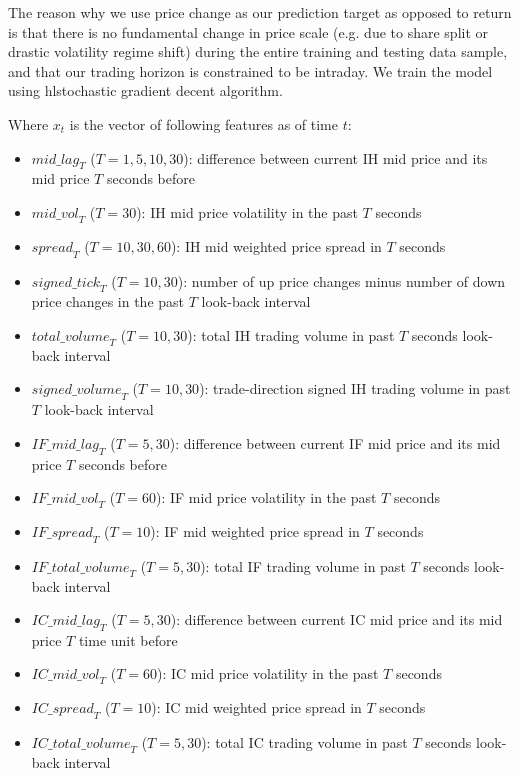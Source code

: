 \documentclass{article}
\begin{document}
The reason why we use price change as our prediction target as opposed to return is that there is no fundamental change in price scale (e.g. due to share split or drastic volatility regime shift) during the entire training and testing data sample, and that our trading horizon is constrained to be intraday. We train the model using hl{stochastic gradient decent algorithm}.

Where $x_t$ is the vector of following features as of time $t$:

\begin{itemize}
\setlength\itemsep{0.1em}
\item ${mid\_lag}_T$ ($T=1,5,10,30$): difference between current IH mid price and its mid price $T$ seconds before
\item ${mid\_vol}_T$ ($T=30$): IH mid price volatility in the past $T$ seconds
\item ${spread}_T$ ($T=10,30,60$): IH mid weighted price spread in $T$ seconds
\item ${signed\_tick}_T$ ($T=10,30$): number of up price changes minus number of down price changes in the past $T$ look-back interval
\item ${total\_volume}_T$ ($T=10,30$): total IH trading volume in past $T$ seconds look-back interval
\item ${signed\_volume}_T$ ($T=10, 30$): trade-direction signed IH trading volume in past $T$ look-back interval
\item ${IF\_mid\_lag}_T$ ($T=5,30$): difference between current IF mid price and its mid price $T$ seconds before
\item ${IF\_mid\_vol}_T$ ($T=60$): IF mid price volatility in the past $T$ seconds
\item ${IF\_spread}_T$ ($T=10$): IF mid weighted price spread in $T$ seconds
\item ${IF\_total\_volume}_T$ ($T=5,30$): total IF trading volume in past $T$ seconds look-back interval
\item ${IC\_mid\_lag}_T$ ($T=5,30$): difference between current IC mid price and its mid price $T$ time unit before
\item ${IC\_mid\_vol}_T$ ($T=60$): IC mid price volatility in the past $T$ seconds
\item ${IC\_spread}_T$ ($T=10$): IC mid weighted price spread in $T$ seconds
\item ${IC\_total\_volume}_T$ ($T=5,30$): total IC trading volume in past $T$ seconds look-back interval
\end{itemize}
\end{document}

